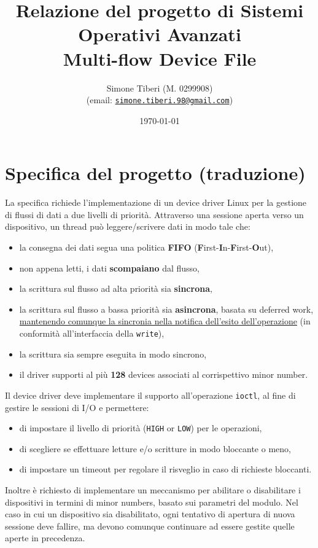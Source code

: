 \documentclass{article}
\title{\small Relazione del progetto di Sistemi Operativi Avanzati \\
\Huge \textbf{Multi-flow Device File}}
\author{Simone Tiberi (M. 0299908)\\%
(email: \texttt{\href{mailto:simone.tiberi.98@gmail.com}{simone.tiberi.98@gmail.com}})}
\date{\today}
\begin{document}
\maketitle

\section{Specifica del progetto (traduzione)}
La specifica richiede l'implementazione di un device driver Linux per la gestione di flussi di dati a due livelli di priorità. Attraverso una sessione aperta verso un dispositivo, un thread può leggere/scrivere dati in modo tale che:
\begin{itemize}
        \item la consegna dei dati segua una politica \textbf{FIFO} (\textbf{F}irst-\textbf{I}n-\textbf{F}irst-\textbf{O}ut),
        \item non appena letti, i dati \textbf{scompaiano} dal flusso,
        \item la scrittura sul flusso ad alta priorità sia \textbf{sincrona},
        \item la scrittura sul flusso a bassa priorità sia \textbf{asincrona}, basata su deferred work, \ul{mantenendo comunque la sincronia nella notifica dell'esito dell'operazione} (in conformità all'interfaccia della \texttt{write}),
        \item la scrittura sia sempre eseguita in modo sincrono,
        \item il driver supporti al più \textbf{128} devices associati al corrispettivo minor number.
\end{itemize}

Il device driver deve implementare il supporto all'operazione \texttt{ioctl}, al fine di gestire le sessioni di I/O e permettere:
\begin{itemize}
        \item di impostare il livello di priorità (\texttt{HIGH} or \texttt{LOW}) per le operazioni,
        \item di scegliere se effettuare letture e/o scritture in modo bloccante o meno,
        \item di impostare un timeout per regolare il risveglio in caso di richieste bloccanti.
\end{itemize}

Inoltre è richiesto di implementare un meccanismo per abilitare o disabilitare i dispositivi in termini di minor numbers, basato sui parametri del modulo. Nel caso in cui un dispositivo sia disabilitato, ogni tentativo di apertura di nuova sessione deve fallire, ma devono comunque continuare ad essere gestite quelle aperte in precedenza.
\end{document}

